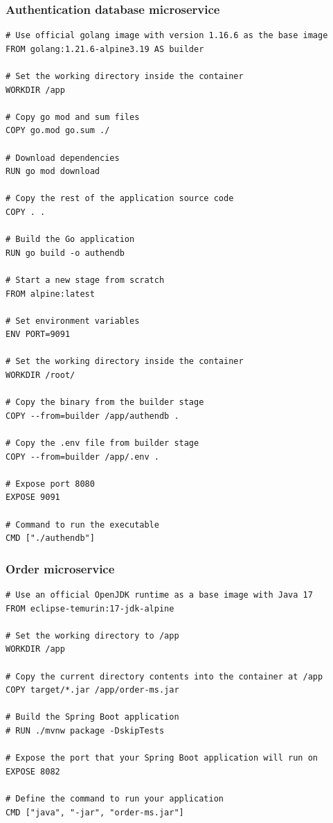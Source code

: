 \subsubsection*{Authentication database microservice}
\begin{lstlisting}[language=docker]
# Use official golang image with version 1.16.6 as the base image
FROM golang:1.21.6-alpine3.19 AS builder

# Set the working directory inside the container
WORKDIR /app

# Copy go mod and sum files
COPY go.mod go.sum ./

# Download dependencies
RUN go mod download

# Copy the rest of the application source code
COPY . .

# Build the Go application
RUN go build -o authendb

# Start a new stage from scratch
FROM alpine:latest  

# Set environment variables
ENV PORT=9091

# Set the working directory inside the container
WORKDIR /root/

# Copy the binary from the builder stage
COPY --from=builder /app/authendb .

# Copy the .env file from builder stage
COPY --from=builder /app/.env .

# Expose port 8080
EXPOSE 9091

# Command to run the executable
CMD ["./authendb"]
\end{lstlisting}

\subsubsection*{Order microservice}
\begin{lstlisting}[language=docker]
# Use an official OpenJDK runtime as a base image with Java 17
FROM eclipse-temurin:17-jdk-alpine

# Set the working directory to /app
WORKDIR /app

# Copy the current directory contents into the container at /app
COPY target/*.jar /app/order-ms.jar

# Build the Spring Boot application
# RUN ./mvnw package -DskipTests

# Expose the port that your Spring Boot application will run on
EXPOSE 8082

# Define the command to run your application
CMD ["java", "-jar", "order-ms.jar"]
\end{lstlisting}

